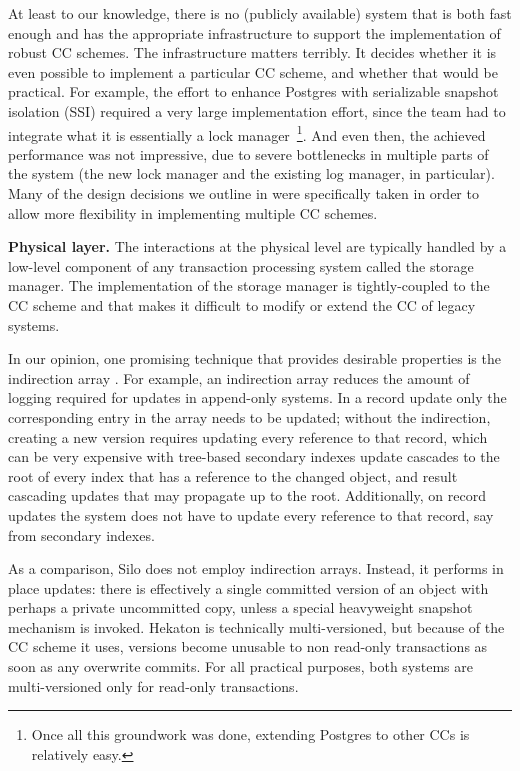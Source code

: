 At least to our knowledge, there is no (publicly available) system that is both fast enough and has the appropriate infrastructure to support the implementation of robust CC schemes. The infrastructure matters terribly. It decides whether it is even possible to implement a particular CC scheme, and whether that would be practical. For example, the effort to enhance Postgres with serializable snapshot isolation (SSI) required a very large implementation effort, since the team had to integrate what it is essentially a lock manager~\footnote{Once all this groundwork was done, extending Postgres to other CCs is relatively easy.}. And even then, the achieved performance was not impressive, due to severe bottlenecks in multiple parts of the system (the new lock manager and the existing log manager, in particular).  Many of the design decisions we outline in  were specifically taken in order to allow more flexibility in implementing multiple CC schemes.

\vspace{2mm}
{\bf Physical layer.} 
The interactions at the physical level are typically handled by a low-level component of any transaction processing system called the storage manager.
The implementation of the storage manager is tightly-coupled to the CC scheme and that makes it difficult to modify or extend the CC of legacy systems.  

In our opinion, one promising technique that provides desirable properties is the indirection array \cite{SadoghiRCB13,Diaconu+13}.
For example, an indirection array reduces the amount of logging required for updates in append-only systems. In a record update only the corresponding entry in the array needs to be updated; without the indirection, creating a new version requires updating every reference to that record, which can be very expensive with tree-based secondary indexes update cascades to the root of every index that has a reference to the changed object, and result cascading updates that may propagate up to the root. Additionally, on record updates the system does not have to update every reference to that record, say from secondary indexes.

As a comparison, Silo does not employ indirection arrays. Instead, it performs in place updates: there is effectively a single committed version of an object with perhaps a private uncommitted copy, unless a special heavyweight snapshot mechanism is invoked. Hekaton is technically multi-versioned, but because of the CC scheme it uses, versions become unusable to non read-only transactions as soon as any overwrite commits. For all practical purposes, both systems are multi-versioned only for read-only transactions.

